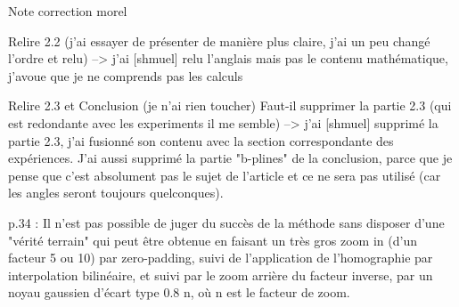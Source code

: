 Note correction morel



Relire 2.2 (j’ai essayer de présenter de manière plus claire, j’ai un peu changé l’ordre et relu)
--> j'ai [shmuel] relu l'anglais mais pas le contenu mathématique, j'avoue que je ne comprends pas les calculs

Relire 2.3 et Conclusion (je n’ai rien toucher) 
Faut-il supprimer la partie 2.3 (qui est redondante avec les experiments il me semble)
--> j'ai [shmuel] supprimé la partie 2.3, j'ai fusionné son contenu avec la section correspondante des expériences. J'ai aussi supprimé la partie "b-plines" de la conclusion, parce que je pense que c'est absolument pas le sujet de l'article et ce ne sera pas utilisé (car les angles seront toujours quelconques).

p.34 : Il n'est pas possible de juger du succès de la méthode sans disposer d'une "vérité terrain" qui peut être obtenue en faisant un très gros zoom in (d'un facteur 5 ou 10) par zero-padding, suivi de l'application de l'homographie par interpolation bilinéaire, et suivi par le zoom arrière du facteur inverse, par un noyau gaussien d'écart type 0.8 n, où n est  le facteur de zoom.
